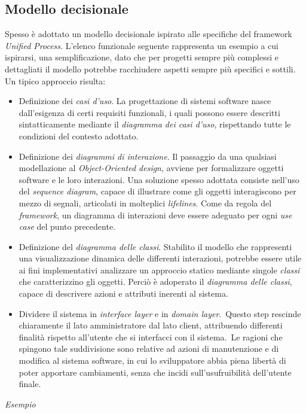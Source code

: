 \documentclass{article}
\begin{document}
\subsection*{Modello decisionale}
\large
Spesso è adottato un modello decisionale ispirato alle specifiche del framework \textit{Unified Process}. L'elenco funzionale seguente rappresenta un esempio a cui ispirarsi, una semplificazione, dato che per progetti sempre più complessi e dettagliati il modello potrebbe racchiudere aspetti sempre più specifici e sottili.\vspace*{14pt}\\
Un tipico approccio risulta:
\begin{itemize}
    \renewcommand{\labelitemi}{-}
    \itemsep0em
    \item Definizione dei \textit{casi d'uso}. La progettazione di sistemi software nasce dall'esigenza di certi requisiti funzionali, i quali possono essere descritti sintatticamente mediante il \textit{diagramma dei casi d'uso}, rispettando tutte le condizioni del contesto adottato.
    \item Definizione dei \textit{diagrammi di interazione}. Il passaggio da una qualsiasi modellazione al \textit{Object-Oriented design}, avviene per formalizzare oggetti software e le loro interazioni. Una soluzione spesso adottata consiste nell'uso del \textit{sequence diagram}, capace di illustrare come gli oggetti interagiscono per mezzo di segnali, articolati in molteplici \textit{lifelines}. Come da regola del \textit{framework}, un diagramma di interazioni deve essere adeguato per ogni \textit{use case} del punto precedente.
    \item Definizione del \textit{diagramma delle classi}. Stabilito il modello che rappresenti una visualizzazione dinamica delle differenti interazioni, potrebbe essere utile ai fini implementativi analizzare un approccio statico mediante singole \textit{classi} che caratterizzino gli oggetti. Perciò è adoperato il \textit{diagramma delle classi}, capace di descrivere azioni e attributi inerenti al sistema.
    \item Dividere il sistema in \textit{interface layer} e in \textit{domain layer}.\ Questo step rescinde chiaramente il lato amministratore dal lato client, attribuendo differenti finalità rispetto all'utente che si interfacci con il sistema.\ Le ragioni che spingono tale suddivisione sono relative ad azioni di manutenzione e di modifica al sistema software, in cui lo sviluppatore abbia piena libertà di poter apportare cambiamenti, senza che incidi sull'usufruibilità dell'utente finale.
\end{itemize}

\textit{Esempio}\\
\end{document}
